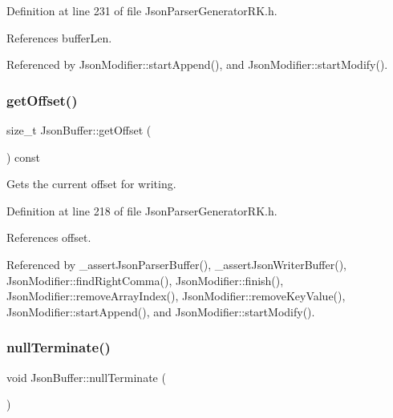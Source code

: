 Definition at line 231 of file Json\+Parser\+Generator\+R\+K.\+h.



References buffer\+Len.



Referenced by Json\+Modifier\+::start\+Append(), and Json\+Modifier\+::start\+Modify().

\mbox{\label{class_json_buffer_adedc049fc02ef5bad2b3f8e7a1ba17b6}} 
\subsubsection{\texorpdfstring{get\+Offset()}{getOffset()}}
{\footnotesize\ttfamily size\+\_\+t Json\+Buffer\+::get\+Offset (\begin{DoxyParamCaption}{ }\end{DoxyParamCaption}) const\hspace{0.3cm}{\ttfamily [inline]}}



Gets the current offset for writing. 



Definition at line 218 of file Json\+Parser\+Generator\+R\+K.\+h.



References offset.



Referenced by \+\_\+assert\+Json\+Parser\+Buffer(), \+\_\+assert\+Json\+Writer\+Buffer(), Json\+Modifier\+::find\+Right\+Comma(), Json\+Modifier\+::finish(), Json\+Modifier\+::remove\+Array\+Index(), Json\+Modifier\+::remove\+Key\+Value(), Json\+Modifier\+::start\+Append(), and Json\+Modifier\+::start\+Modify().

\mbox{\label{class_json_buffer_a9f649ceeed76bb798c0bf9792b56d743}} 
\subsubsection{\texorpdfstring{null\+Terminate()}{nullTerminate()}}
{\footnotesize\ttfamily void Json\+Buffer\+::null\+Terminate (\begin{DoxyParamCaption}{ }\end{DoxyParamCaption})}



